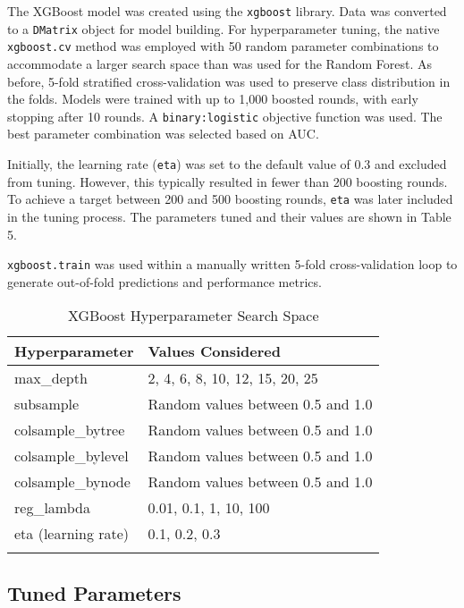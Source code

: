 \documentclass{article}      %
\begin{document}
The XGBoost model was created using the \texttt{xgboost} library. Data was converted to a \texttt{DMatrix} object for model building. For hyperparameter tuning, the native \texttt{xgboost.cv} method was employed with 50 random parameter combinations to accommodate a larger search space than was used for the Random Forest. As before, 5-fold stratified cross-validation was used to preserve class distribution in the folds. Models were trained with up to 1,000 boosted rounds, with early stopping after 10 rounds. A \texttt{binary:logistic} objective function was used. The best parameter combination was selected based on AUC.

Initially, the learning rate (\texttt{eta}) was set to the default value of 0.3 and excluded from tuning. However, this typically resulted in fewer than 200 boosting rounds. To achieve a target between 200 and 500 boosting rounds, \texttt{eta} was later included in the tuning process. The parameters tuned and their values are shown in Table 5.

\texttt{xgboost.train} was used within a manually written 5-fold cross-validation loop to generate out-of-fold predictions and performance metrics.

\begin{table}[!h]
    \centering
    \caption{XGBoost Hyperparameter Search Space}
    \begin{tabular}{l|l}
    \arrayrulecolor{black}  %
    \toprule
    \textbf{Hyperparameter} & \textbf{Values Considered} \\
    \midrule
    \arrayrulecolor{lightgray}
    max\_depth & 2, 4, 6, 8, 10, 12, 15, 20, 25 \\
    \hline
    subsample & Random values between 0.5 and 1.0 \\
    \hline
    colsample\_bytree & Random values between 0.5 and 1.0 \\
    \hline
    colsample\_bylevel & Random values between 0.5 and 1.0 \\
    \hline
    colsample\_bynode & Random values between 0.5 and 1.0 \\
    \hline
    reg\_lambda & 0.01, 0.1, 1, 10, 100 \\
    \hline
    eta (learning rate) & 0.1, 0.2, 0.3 \\
    \arrayrulecolor{black}
    \bottomrule
    \end{tabular}
    \label{table:xgb_params}
\end{table}

\subsection{Tuned Parameters}
\end{document}

